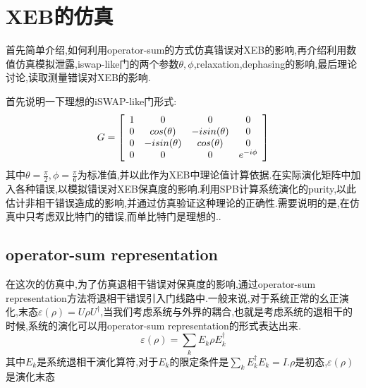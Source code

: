 \chapter{XEB的仿真}

首先简单介绍,如何利用operator-sum的方式仿真错误对XEB的影响,再介绍利用数值仿真模拟泄露,iswap-like门的两个参数$\theta,\phi$,relaxation,dephasing的影响,最后理论讨论,读取测量错误对XEB的影响.

首先说明一下理想的iSWAP-like门形式:
\begin{equation}
\centering 
G=\left[
\begin{array}{cccc}  
1 & 0 & 0 & 0\\ 
0 & cos(\theta) & -isin(\theta) & 0\\ 
0 & -isin(\theta) & cos(\theta) & 0\\ 
0 & 0 & 0 & e^{-i\phi}\\ 
\end{array}
\right ]
\end{equation}
其中$\theta=\frac{\pi}{2},\phi = \frac{\pi}{6}$为标准值,并以此作为XEB中理论值计算依据.在实际演化矩阵中加入各种错误,以模拟错误对XEB保真度的影响.利用SPB计算系统演化的purity,以此估计非相干错误造成的影响,并通过仿真验证这种理论的正确性.需要说明的是,在仿真中只考虑双比特门的错误,而单比特门是理想的..
\section{operator-sum representation}
在这次的仿真中,为了仿真退相干错误对保真度的影响,通过operator-sum representation方法将退相干错误引入门线路中.一般来说,对于系统正常的幺正演化,末态$\varepsilon(\rho) = U\rho U^{\dagger}$,当我们考虑系统与外界的耦合,也就是考虑系统的退相干的时候,系统的演化可以用operator-sum representation的形式表达出来\cite{nielsen2010quantum}.
\begin{equation}
\varepsilon(\rho) = \sum_{k}E_{k}\rho E^{\dagger}_{k}
\end{equation}
其中$E_{k}$是系统退相干演化算符,对于$E_{k}$的限定条件是$\sum_{k} E^{\dagger}_{k}E_{k} = I$.$\rho$是初态,$\varepsilon(\rho)$是演化末态

